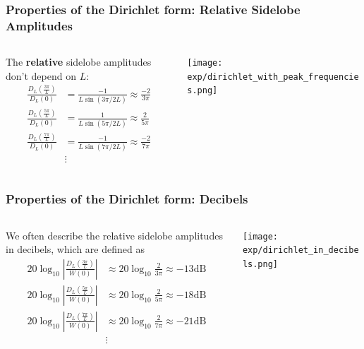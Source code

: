 \documentclass{beamer}
\begin{document}
\begin{frame}
  \frametitle{Properties of the Dirichlet form: Relative Sidelobe Amplitudes}

  \begin{columns}
    \begin{column}{0.5\textwidth}

      The \textbf{relative} sidelobe amplitudes don't depend on $L$:
      \begin{align*}      
        \frac{D_L\left(\frac{3\pi}{L}\right)}{D_L(0)} &=
        \frac{-1}{L\sin(3\pi/2L)}\approx \frac{-2}{3\pi}\\
        \frac{D_L\left(\frac{5\pi}{L}\right)}{D_L(0)} &=
        \frac{1}{L\sin(5\pi/2L)}\approx \frac{2}{5\pi}\\
        \frac{D_L\left(\frac{7\pi}{L}\right)}{D_L(0)} &=
        \frac{-1}{L\sin(7\pi/2L)}\approx \frac{-2}{7\pi}\\
        & \vdots
      \end{align*}
    \end{column}
    \begin{column}{0.5\textwidth}
      \centerline{\texttt{[image: exp/dirichlet\_with\_peak\_frequencies.png]}}
    \end{column}
  \end{columns}
\end{frame}

\begin{frame}
  \frametitle{Properties of the Dirichlet form: Decibels}
  \begin{columns}
    \begin{column}{0.5\textwidth}

      We often describe the relative sidelobe amplitudes in decibels,
      which are defined as
      \begin{align*}      
        20\log_{10}\left|\frac{D_L\left(\frac{3\pi}{L}\right)}{W(0)}\right| &\approx
        20\log_{10}\frac{2}{3\pi}\approx -13\mbox{dB}\\
        20\log_{10}\left|\frac{D_L\left(\frac{5\pi}{L}\right)}{W(0)}\right| &\approx
        20\log_{10}\frac{2}{5\pi}\approx -18\mbox{dB}\\
        20\log_{10}\left|\frac{D_L\left(\frac{7\pi}{L}\right)}{W(0)}\right| &\approx
        20\log_{10}\frac{2}{7\pi}\approx -21\mbox{dB}\\
        & \vdots
      \end{align*}
    \end{column}
    \begin{column}{0.5\textwidth}
      \centerline{\texttt{[image: exp/dirichlet\_in\_decibels.png]}}
    \end{column}
  \end{columns}
\end{frame}
\end{document}
